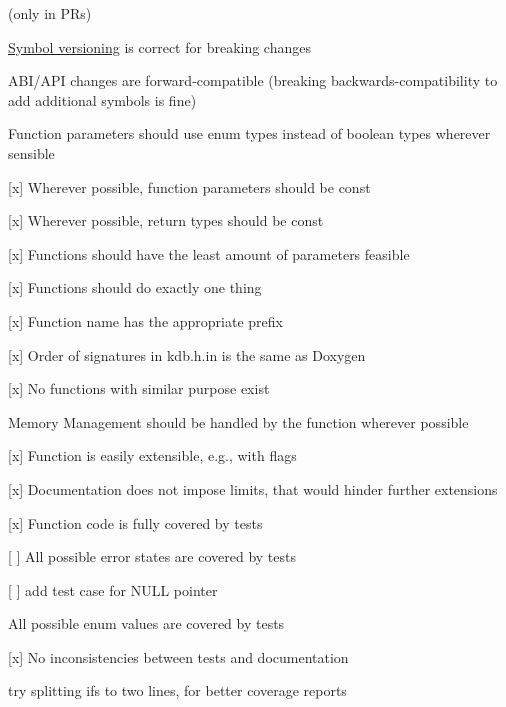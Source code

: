 (only in P\+Rs)


\begin{DoxyItemize}
\item \hyperlink{doc_dev_symbol-versioning_md}{Symbol versioning} is correct for breaking changes
\item A\+B\+I/\+A\+PI changes are forward-\/compatible (breaking backwards-\/compatibility to add additional symbols is fine)
\end{DoxyItemize}


\begin{DoxyItemize}
\item Function parameters should use enum types instead of boolean types wherever sensible
\item \mbox{[}x\mbox{]} Wherever possible, function parameters should be {\ttfamily const}
\item \mbox{[}x\mbox{]} Wherever possible, return types should be {\ttfamily const}
\item \mbox{[}x\mbox{]} Functions should have the least amount of parameters feasible
\end{DoxyItemize}


\begin{DoxyItemize}
\item \mbox{[}x\mbox{]} Functions should do exactly one thing
\item \mbox{[}x\mbox{]} Function name has the appropriate prefix
\item \mbox{[}x\mbox{]} Order of signatures in kdb.\+h.\+in is the same as Doxygen
\item \mbox{[}x\mbox{]} No functions with similar purpose exist
\end{DoxyItemize}


\begin{DoxyItemize}
\item Memory Management should be handled by the function wherever possible
\end{DoxyItemize}


\begin{DoxyItemize}
\item \mbox{[}x\mbox{]} Function is easily extensible, e.\+g., with flags
\item \mbox{[}x\mbox{]} Documentation does not impose limits, that would hinder further extensions
\end{DoxyItemize}


\begin{DoxyItemize}
\item \mbox{[}x\mbox{]} Function code is fully covered by tests
\item \mbox{[} \mbox{]} All possible error states are covered by tests
\begin{DoxyItemize}
\item \mbox{[} \mbox{]} add test case for N\+U\+LL pointer
\end{DoxyItemize}
\item All possible enum values are covered by tests
\item \mbox{[}x\mbox{]} No inconsistencies between tests and documentation
\end{DoxyItemize}

try splitting ifs to two lines, for better coverage reports